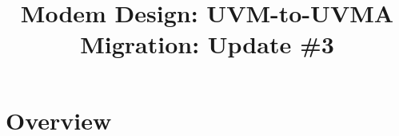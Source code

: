 \documentclass{note}
\begin{document}
\small


\title{\large\bf{}\textcolor{blue2}{Modem Design: UVM-to-UVMA Migration:
    Update \#3}}
\date{}
\maketitle

\tableofcontents

\linenumbers
\section{Overview}
\end{document}
